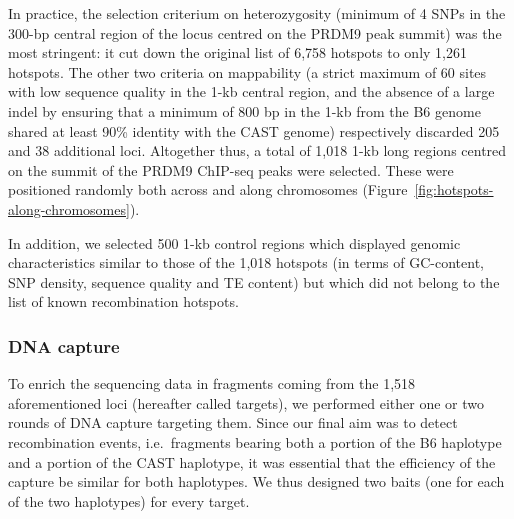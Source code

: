 In practice, the selection criterium on heterozygosity (minimum of 4 SNPs in the 300-bp central region of the locus centred on the PRDM9 peak summit) was the most stringent: it cut down the original list of 6,758 hotspots to only 1,261 hotspots.
The other two criteria on mappability (a strict maximum of 60 sites with low sequence quality in the 1-kb central region, and the absence of a large indel by ensuring that a minimum of 800 bp in the 1-kb from the B6 genome shared at least 90\% identity with the CAST genome) respectively discarded 205 and 38 additional loci.
Altogether thus, a total of 1,018 1-kb long regions centred on the summit of the PRDM9 ChIP-seq peaks were selected.
These were positioned randomly both across and along chromosomes (Figure~\ref{fig:hotspots-along-chromosomes}).








In addition, we selected 500 1-kb control regions which displayed genomic characteristics similar to those of the 1,018 hotspots (in terms of GC-content, SNP density, sequence quality and TE content) but which did not belong to the list of known recombination hotspots.

\subsubsection{DNA capture}

To enrich the sequencing data in fragments coming from the 1,518 aforementioned loci (hereafter called targets), we performed either one or two rounds of DNA capture targeting them.
Since our final aim was to detect recombination events, i.e.\ fragments bearing both a portion of the B6 haplotype and a portion of the CAST haplotype, it was essential that the efficiency of the capture be similar for both haplotypes.
We thus designed two baits (one for each of the two haplotypes) for every target.

